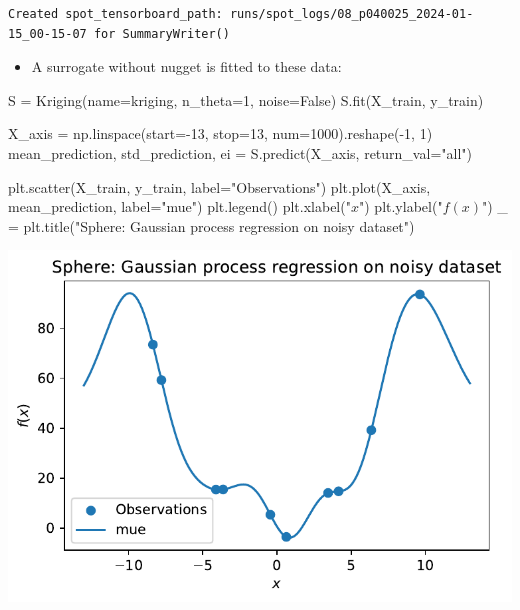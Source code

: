 \documentclass[
  letterpaper,
  DIV=11,
  numbers=noendperiod]{scrreprt}
\newenvironment{Shaded}{\begin{snugshade}}{\end{snugshade}}
\newcommand{\DecValTok}[1]{\textcolor[rgb]{0.68,0.00,0.00}{#1}}
\newcommand{\NormalTok}[1]{\textcolor[rgb]{0.00,0.23,0.31}{#1}}
\newcommand{\OperatorTok}[1]{\textcolor[rgb]{0.37,0.37,0.37}{#1}}
\newcommand{\StringTok}[1]{\textcolor[rgb]{0.13,0.47,0.30}{#1}}
\newcommand{\VariableTok}[1]{\textcolor[rgb]{0.07,0.07,0.07}{#1}}
\providecommand{\tightlist}{%
  \setlength{\itemsep}{0pt}\setlength{\parskip}{0pt}}\usepackage{longtable,booktabs,array}
\begin{document}
\begin{verbatim}
Created spot_tensorboard_path: runs/spot_logs/08_p040025_2024-01-15_00-15-07 for SummaryWriter()
\end{verbatim}

\begin{itemize}
\tightlist
\item
  A surrogate without nugget is fitted to these data:
\end{itemize}

\begin{Shaded}
\begin{Highlighting}[]
\NormalTok{S }\OperatorTok{=}\NormalTok{ Kriging(name}\OperatorTok{=}\StringTok{\textquotesingle{}kriging\textquotesingle{}}\NormalTok{,}
\NormalTok{            n\_theta}\OperatorTok{=}\DecValTok{1}\NormalTok{,}
\NormalTok{            noise}\OperatorTok{=}\VariableTok{False}\NormalTok{)}
\NormalTok{S.fit(X\_train, y\_train)}

\NormalTok{X\_axis }\OperatorTok{=}\NormalTok{ np.linspace(start}\OperatorTok{={-}}\DecValTok{13}\NormalTok{, stop}\OperatorTok{=}\DecValTok{13}\NormalTok{, num}\OperatorTok{=}\DecValTok{1000}\NormalTok{).reshape(}\OperatorTok{{-}}\DecValTok{1}\NormalTok{, }\DecValTok{1}\NormalTok{)}
\NormalTok{mean\_prediction, std\_prediction, ei }\OperatorTok{=}\NormalTok{ S.predict(X\_axis, return\_val}\OperatorTok{=}\StringTok{"all"}\NormalTok{)}

\NormalTok{plt.scatter(X\_train, y\_train, label}\OperatorTok{=}\StringTok{"Observations"}\NormalTok{)}
\NormalTok{plt.plot(X\_axis, mean\_prediction, label}\OperatorTok{=}\StringTok{"mue"}\NormalTok{)}
\NormalTok{plt.legend()}
\NormalTok{plt.xlabel(}\StringTok{"$x$"}\NormalTok{)}
\NormalTok{plt.ylabel(}\StringTok{"$f(x)$"}\NormalTok{)}
\NormalTok{\_ }\OperatorTok{=}\NormalTok{ plt.title(}\StringTok{"Sphere: Gaussian process regression on noisy dataset"}\NormalTok{)}
\end{Highlighting}
\end{Shaded}

\includegraphics{013_num_spot_noisy_files/figure-pdf/cell-14-output-1.pdf}
\end{document}
